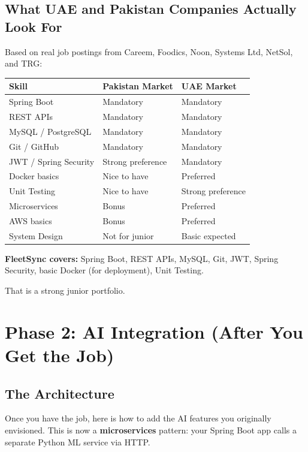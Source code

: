 \documentclass[12pt,a4paper]{report}
\newcommand{\term}[1]{\textbf{\textcolor{primaryblue}{#1}}}
\begin{document}
\section{What UAE and Pakistan Companies Actually Look For}

Based on real job postings from Careem, Foodics, Noon, Systems Ltd, NetSol, and TRG:

\begin{tabularx}{\textwidth}{@{}lXX@{}}
\toprule
\textbf{Skill} & \textbf{Pakistan Market} & \textbf{UAE Market} \\
\midrule
Spring Boot & Mandatory & Mandatory \\
REST APIs & Mandatory & Mandatory \\
MySQL / PostgreSQL & Mandatory & Mandatory \\
Git / GitHub & Mandatory & Mandatory \\
JWT / Spring Security & Strong preference & Mandatory \\
Docker basics & Nice to have & Preferred \\
Unit Testing & Nice to have & Strong preference \\
Microservices & Bonus & Preferred \\
AWS basics & Bonus & Preferred \\
System Design & Not for junior & Basic expected \\
\bottomrule
\end{tabularx}

\textbf{FleetSync covers:} Spring Boot, REST APIs, MySQL, Git, JWT, Spring Security, basic Docker (for deployment), Unit Testing.

That is a strong junior portfolio.

\chapter{Phase 2: AI Integration (After You Get the Job)}

\section{The Architecture}

Once you have the job, here is how to add the AI features you originally envisioned. This is now a \term{microservices} pattern: your Spring Boot app calls a separate Python ML service via HTTP.
\end{document}
